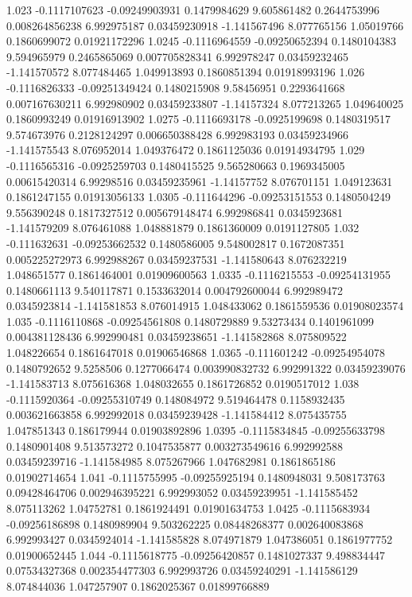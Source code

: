 {1.023 -0.1117107623 -0.09249903931 0.1479984629 9.605861482 0.2644753996 0.008264856238 6.992975187 0.03459230918 -1.141567496 8.077765156 1.05019766 0.1860699072 0.01921172296
1.0245 -0.1116964559 -0.09250652394 0.1480104383 9.594965979 0.2465865069 0.007705828341 6.992978247 0.03459232465 -1.141570572 8.077484465 1.049913893 0.1860851394 0.01918993196
1.026 -0.1116826333 -0.09251349424 0.1480215908 9.58456951 0.2293641668 0.007167630211 6.992980902 0.03459233807 -1.14157324 8.077213265 1.049640025 0.1860993249 0.01916913902
1.0275 -0.1116693178 -0.0925199698 0.1480319517 9.574673976 0.2128124297 0.006650388428 6.992983193 0.03459234966 -1.141575543 8.076952014 1.049376472 0.1861125036 0.01914934795
1.029 -0.1116565316 -0.0925259703 0.1480415525 9.565280663 0.1969345005 0.00615420314 6.99298516 0.03459235961 -1.14157752 8.076701151 1.049123631 0.1861247155 0.01913056133
1.0305 -0.111644296 -0.09253151553 0.1480504249 9.556390248 0.1817327512 0.005679148474 6.992986841 0.0345923681 -1.141579209 8.076461088 1.048881879 0.1861360009 0.0191127805
1.032 -0.111632631 -0.09253662532 0.1480586005 9.548002817 0.1672087351 0.005225272973 6.992988267 0.03459237531 -1.141580643 8.076232219 1.048651577 0.1861464001 0.01909600563
1.0335 -0.1116215553 -0.09254131955 0.1480661113 9.540117871 0.1533632014 0.004792600044 6.992989472 0.0345923814 -1.141581853 8.076014915 1.048433062 0.1861559536 0.01908023574
1.035 -0.1116110868 -0.09254561808 0.1480729889 9.53273434 0.1401961099 0.004381128436 6.992990481 0.03459238651 -1.141582868 8.075809522 1.048226654 0.1861647018 0.01906546868
1.0365 -0.111601242 -0.09254954078 0.1480792652 9.5258506 0.1277066474 0.003990832732 6.992991322 0.03459239076 -1.141583713 8.075616368 1.048032655 0.1861726852 0.0190517012
1.038 -0.1115920364 -0.09255310749 0.148084972 9.519464478 0.1158932435 0.003621663858 6.992992018 0.03459239428 -1.141584412 8.075435755 1.047851343 0.186179944 0.01903892896
1.0395 -0.1115834845 -0.09255633798 0.1480901408 9.513573272 0.1047535877 0.003273549616 6.992992588 0.03459239716 -1.141584985 8.075267966 1.047682981 0.1861865186 0.01902714654
1.041 -0.1115755995 -0.09255925194 0.1480948031 9.508173763 0.09428464706 0.002946395221 6.992993052 0.03459239951 -1.141585452 8.075113262 1.04752781 0.1861924491 0.01901634753
1.0425 -0.1115683934 -0.09256186898 0.1480989904 9.503262225 0.08448268377 0.002640083868 6.992993427 0.0345924014 -1.141585828 8.074971879 1.047386051 0.1861977752 0.01900652445
1.044 -0.1115618775 -0.09256420857 0.1481027337 9.498834447 0.07534327368 0.002354477303 6.992993726 0.03459240291 -1.141586129 8.074844036 1.047257907 0.1862025367 0.01899766889
}
